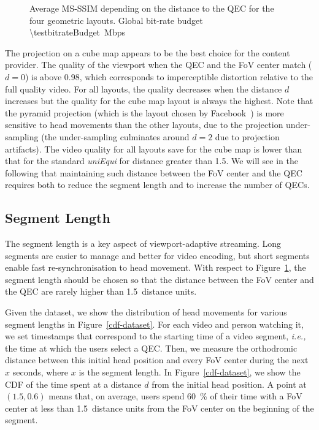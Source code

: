 \begin{figure}
    
       \caption{Average \acs{MS-SSIM} depending on the distance to the \acs{QEC} for the four geometric layouts. Global bit-rate budget \SI{\testbitrateBudget}{\mega bps}}
    \label{fig:dist_quality}
\end{figure}

The projection on a cube map appears to be the best choice for the
content provider. The quality of the viewport when the \ac{QEC} and
the \ac{FoV} center match ($d=0$) is above \num{0.98}, which
corresponds to imperceptible distortion relative to the full quality
video. For all layouts, the quality decreases when the distance $d$
increases but the quality for the cube map layout is always the
highest. Note that the pyramid projection (which is the layout chosen
by Facebook~\cite{facebook}) is more sensitive to head movements than
the other layouts, due to the projection under-sampling (the
under-sampling culminates around $d=2$ due to projection artifacts).
The video quality for all layouts save for the cube map is lower than
that for the standard \emph{uniEqui} for distance greater than
\num{1.5}.  We will see in
the following that maintaining such distance between the \ac{FoV}
center and the \ac{QEC} requires both to reduce the segment length and
to increase the number of \acp{QEC}.

\subsection{Segment Length}
\label{subsec:segmentLength}

The segment length is a key aspect of viewport-adaptive streaming.
Long segments are easier to manage and better for video encoding, but
short segments enable fast re-synchronisation to head movement. With
respect to Figure~\ref{fig:dist_quality}, the segment length
should be chosen so that the distance between the \ac{FoV} center and
the \ac{QEC} are rarely higher than \num{1.5}~distance units.

Given the dataset, we show the distribution of head movements for
various segment lengths in Figure~\ref{cdf-dataset}. For each video
and person watching it, we set timestamps that correspond to the
starting time of a video segment, \textit{i.e.,} the time at which the
users select a \ac{QEC}. Then, we measure the orthodromic distance
between this initial head position and every \ac{FoV} center during
the next $x$ seconds, where $x$ is the segment length. In
Figure~\ref{cdf-dataset}, we show the \ac{CDF} of the time spent at a
distance $d$ from the initial head position. A point at $(1.5,0.6)$
means that, on average, users spend \SI{60}{\percent} of their time
with a \ac{FoV} center at less than \num{1.5}~distance units from the
\ac{FoV} center on the beginning of the segment.

